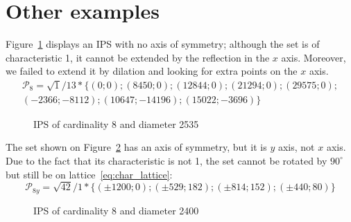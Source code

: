 \documentclass[12pt]{article}
\theoremstyle{theorem}
\theoremstyle{dfn}
\theoremstyle{remark}
\begin{document}
\section{Other examples}

Figure~\ref{8_2535_1_d680} displays an IPS with
no axis of symmetry;
although the set is of characteristic 1,
it cannot be extended by the reflection in the $x$ axis.
Moreover, we failed to extend it by dilation and looking for extra points on the $x$ axis.
%
%
\begin{multline}
	\mathcal{P}_8=
	\sqrt{1}/13*
	\{
	( 0 ; 0);
	( 8450 ; 0);
	( 12844 ; 0);
	( 21294 ; 0);
	( 29575 ; 0);
	\\
	( -2366 ; -8112);
	( 10647 ; -14196);
	( 15022 ; -3696)
	\}
\end{multline}
%
\begin{figure}[h!]
\parbox{1\linewidth}{\caption{IPS of cardinality 8 and diameter 2535}
\label{8_2535_1_d680}}
\end{figure}

The set shown on Figure~\ref{8_2400_42_56f3} has an axis of symmetry, but it is $y$ axis, not $x$ axis.
Due to the fact that its characteristic is not 1,
the set cannot be rotated by $90^\circ$ but still be on lattice~\eqref{eq:char_lattice}:
\begin{equation}
	\mathcal{P}_{8y}=
	\sqrt{42}/1*\{( \pm1200 ; 0);
	( \pm529 ; 182);
	( \pm814 ; 152);
	( \pm440 ; 80)
	\}
\end{equation}

\begin{figure}[h!]
	\parbox{1\linewidth}{\caption{IPS of cardinality 8 and diameter 2400}
	\label{8_2400_42_56f3}}
\end{figure}
\end{document}
